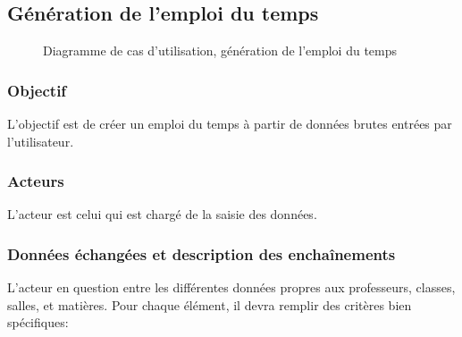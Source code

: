 \documentclass[12pt,a4paper,french]{article}
\begin{document}
\subsection{Génération de l'emploi du temps}    
\begin{figure}[! ht ]
    \centering
    \begin{minipage}[t]{14 cm}
        \centering
        \caption {Diagramme de cas d'utilisation, génération de l'emploi du temps}
    \end{minipage}
\end{figure}
            
\subsubsection{Objectif}
L'objectif est de créer un emploi du temps à partir de données brutes entrées par l'utilisateur.

\subsubsection{Acteurs}
L'acteur est celui qui est chargé de la saisie des données.
        
\subsubsection{Données échangées et description des enchaînements}    
L'acteur en question entre les différentes données propres aux professeurs, classes, salles, et matières. Pour chaque élément, il devra remplir des critères bien spécifiques:
\end{document}
